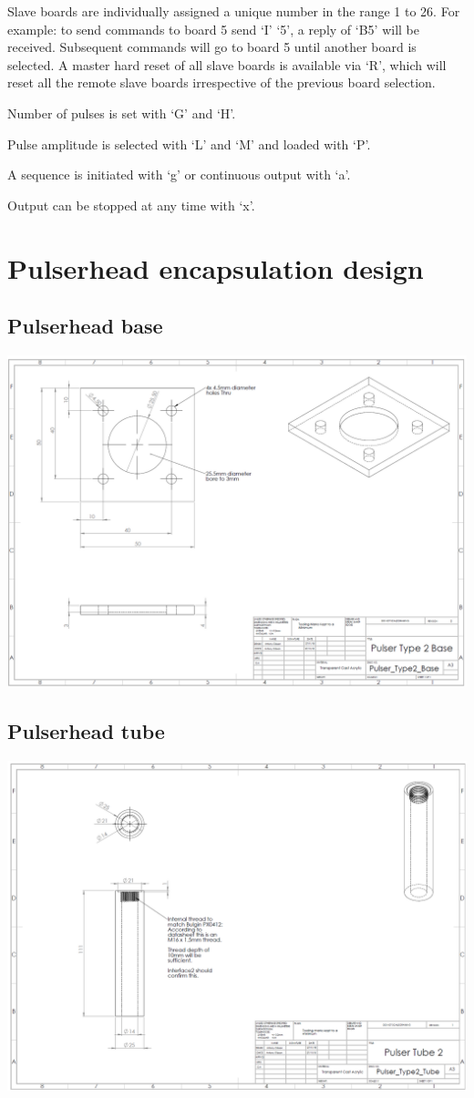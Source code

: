 Slave boards are individually assigned a unique number in the range 1 to 26. For example: to send commands to board 5 send ‘I’ ‘5’, a reply of ‘B5’ will be received. Subsequent commands will go to board 5 until another board is selected. A master hard reset of all slave boards is available via ‘R’, which will reset all the remote slave boards irrespective of the previous board selection.

Number of pulses is set with ‘G’ and ‘H’.

Pulse amplitude is selected with ‘L’ and  ‘M’ and loaded with ‘P’.

A sequence is initiated with ‘g’ or  continuous output with ‘a’.               

Output can be stopped at any time with ‘x’.
\newpage
%
%
\section{Pulserhead encapsulation design}
\label{app:pulserhead_design}
\subsection*{Pulserhead base}
\includegraphics[width=0.8\linewidth]{figures/pulserhead_base.png}
\subsection*{Pulserhead tube}
\includegraphics[width=0.8\linewidth]{figures/pulserhead_tube.png}
\newpage
%

